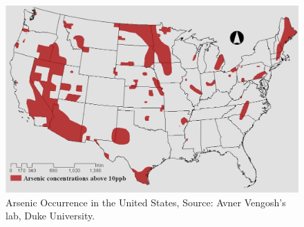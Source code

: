 \documentclass[12pt,]{article}
\begin{document}
\begin{figure}
\centering
\includegraphics{../Data/Processed/ArsenicFigure.png}
\caption{Arsenic Occurrence in the United States, Source: Avner
Vengosh's lab, Duke University.}
\end{figure}
\end{document}
